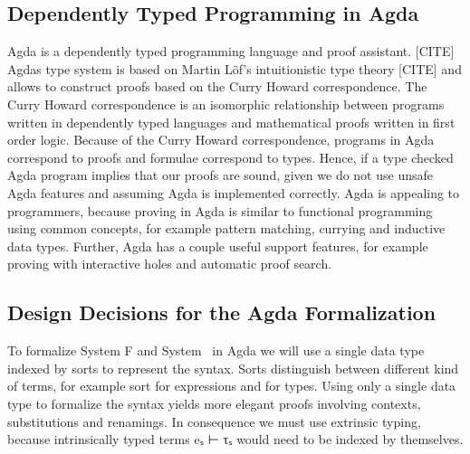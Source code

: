 \subsection{Dependently Typed Programming in Agda}
Agda is a dependently typed programming language and proof assistant. [CITE]
Agdas type system is based on Martin Löf's intuitionistic type theory [CITE] and allows to construct proofs based on the Curry Howard correspondence. 
The Curry Howard correspondence is an isomorphic relationship between programs written in dependently typed languages and mathematical proofs written in first order logic. Because of the Curry Howard correspondence, programs in Agda correspond to proofs and formulae correspond to types. 
Hence, if a type checked Agda program implies that our proofs are sound, given we do not use unsafe Agda features and assuming Agda is implemented correctly. 
Agda is appealing to programmers, because proving in Agda is similar to functional programming using common concepts, for example pattern matching, currying and inductive data types.
Further, Agda has a couple useful support features, for example proving with interactive holes and automatic proof search.
\subsection{Design Decisions for the Agda Formalization}
To formalize System F and System \Fo\ in Agda we will use a single data type  indexed by sorts  to represent the syntax. Sorts distinguish between different kind of terms, for example sort  for expressions and  for types. Using only a single data type to formalize the syntax yields more elegant proofs involving contexts, substitutions and renamings. In consequence we must use extrinsic typing, because intrinsically typed terms  eₛ ⊢  τₛ would need to be indexed by themselves. 